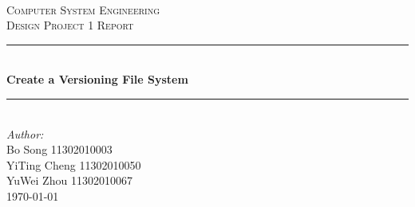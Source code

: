 \begin{titlepage}

\newcommand{\HRule}{\rule{\linewidth}{0.5mm}} %

\center %
 

\textsc{\LARGE}\\[1.5cm] %
\textsc{\Large Computer System Engineering}\\[0.5cm] %
\textsc{\large Design Project 1 Report}\\[0.5cm] %


\HRule \\[0.4cm]
{ \huge \bfseries Create a Versioning File System}\\[0.4cm] %
\HRule \\[1.5cm]
 

\Large \emph{Author:}\\
Bo Song  \textsc{11302010003}\\%
YiTing Cheng  \textsc{11302010050}\\%
YuWei Zhou  \textsc{11302010067}\\[3cm]%


{\large \today}\\[3cm] %


 

\vfill %

\end{titlepage}

